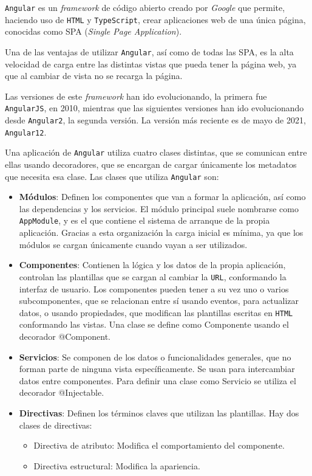 \documentclass[a4paper, 12pt]{book}
\begin{document}
\texttt{Angular}\cite{angularjs} es un \textit{framework} de código abierto creado por \textit{Google} que permite, haciendo uso de \texttt{HTML} y \texttt{TypeScript}, crear aplicaciones web de una única página, conocidas como SPA (\textit{Single Page Application}).

Una de las ventajas de utilizar \texttt{Angular}, así como de todas las SPA, es la alta velocidad de carga entre las distintas vistas que pueda tener la página web, ya que al cambiar de vista no se recarga la página.

Las versiones de este \textit{framework} han ido evolucionando, la primera fue \texttt{AngularJS}, en 2010, mientras que las siguientes versiones han ido evolucionando desde \texttt{Angular2}, la segunda versión. La versión más reciente es de mayo de 2021, \texttt{Angular12}.

Una aplicación de \texttt{Angular} utiliza cuatro clases distintas, que se comunican entre ellas usando decoradores, que se encargan de cargar únicamente los metadatos que necesita esa clase. Las clases que utiliza \texttt{Angular} son:

\begin{itemize}
	\item \textbf{Módulos}: Definen los componentes que van a formar la aplicación, así como las dependencias y los servicios. El módulo principal suele nombrarse como \texttt{AppModule}, y es el que contiene el sistema de arranque de la propia aplicación. Gracias a esta organización la carga inicial es mínima, ya que los módulos se cargan únicamente cuando vayan a ser utilizados.
	\item \textbf{Componentes}: Contienen la lógica y los datos de la propia aplicación, controlan las plantillas que se cargan al cambiar la \texttt{URL}, conformando la interfaz de usuario. Los componentes pueden tener a su vez uno o varios subcomponentes, que se relacionan entre sí usando eventos, para actualizar datos, o usando propiedades, que modifican las plantillas escritas en \texttt{HTML} conformando las vistas. Una clase se define como Componente usando el decorador @Component.
	\item \textbf{Servicios}: Se componen de los datos o funcionalidades generales, que no forman parte de ninguna vista específicamente. Se usan para intercambiar datos entre componentes. Para definir una clase como Servicio se utiliza el decorador @Injectable.
	\item \textbf{Directivas}: Definen los términos claves que utilizan las plantillas. Hay dos clases de directivas:
	\begin{itemize}
		\item Directiva de atributo: Modifica el comportamiento del componente.
		\item Directiva estructural: Modifica la apariencia.
	\end{itemize}
\end{itemize}
\end{document}
